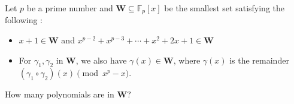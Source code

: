 Let $p$ be a prime number and $\mathbf{W}\subseteq \mathbb{F}_p[x]$ be the smallest set satisfying the following :
\begin{itemize}
  \item $x+1\in \mathbf{W}$ and $x^{p-2}+x^{p-3}+\cdots +x^2+2x+1\in \mathbf{W}$
  \item For $\gamma_1,\gamma_2$ in $\mathbf{W}$, we also have $\gamma(x)\in \mathbf{W}$, where $\gamma(x)$ is the remainder $(\gamma_1\circ \gamma_2)(x)\pmod {x^p-x}$.
\end{itemize}
How many polynomials are in $\mathbf{W}?$
